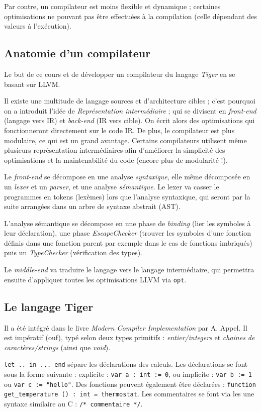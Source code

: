 \documentclass{article}
\begin{document}
Par contre, un compilateur est moins flexible et dynamique ; certaines optimisations ne pouvant pas être effectuées à la compilation (celle dépendant des valeurs à l'exécution).

\subsection{Anatomie d'un compilateur}
Le but de ce cours et de développer un compilateur du langage \emph{Tiger} en se basant sur LLVM.

Il existe une multitude de langage sources et d'architecture cibles ; c'est pourquoi on a introduit l'idée de \emph{Représentation intermédiaire} ; qui se divisent en \emph{front-end} (langage vers IR) et \emph{back-end} (IR vers cible). On écrit alors des optimisations qui fonctionneront directement sur le code IR. De plus, le compilateur est plus modulaire, ce qui est un grand avantage. Certains compilateurs utilisent même plusieurs représentation intermédiaires afin d'améliorer la simplicité des optimisations et la maintenabilité du code (encore plus de modularité !).

Le \emph{front-end} se décompose en une analyse \emph{syntaxique}, elle même décomposée en un \emph{lexer} et un \emph{parser}, et une analyse \emph{sémantique}. Le lexer va casser le programmes en tokens (lexèmes) lors que l'analyse syntaxique, qui seront par la suite arrangées dans un arbre de syntaxe abstrait (AST).

L'analyse sémantique se décompose en une phase de \emph{binding} (lier les symboles à leur déclaration), une phase \emph{EscapeChecker} (trouver les symboles d'une fonction définis dans une fonction parent par exemple dans le cas de fonctions imbriqués) puis un \emph{TypeChecker} (vérification des types).

Le \emph{middle-end} va traduire le langage vers le langage intermédiaire, qui permettra ensuite d'appliquer toutes les optimisations LLVM via \texttt{opt}.

\subsection{Le langage Tiger}
Il a été intégré dans le livre \emph{Modern Compiler Implementation} par A. Appel. Il est impératif (ouf), typé selon deux types primitifs : \textit{entier/integers} et \textit{chaines de caractères/strings} (ainsi que \textit{void}).

\texttt{let .. in ... end} sépare les déclarations des calculs.
Les déclarations se font sous la forme suivante : explicite : \texttt{var a : int := 0}, ou implicite : \texttt{var b := 1} ou \texttt{var c := "hello"}. Des fonctions peuvent également être déclarées : \texttt{function get\_temperature () : int = thermostat}. Les commentaires se font via les une syntaxe similaire au C : \texttt{/* commentaire */}.
\end{document}
